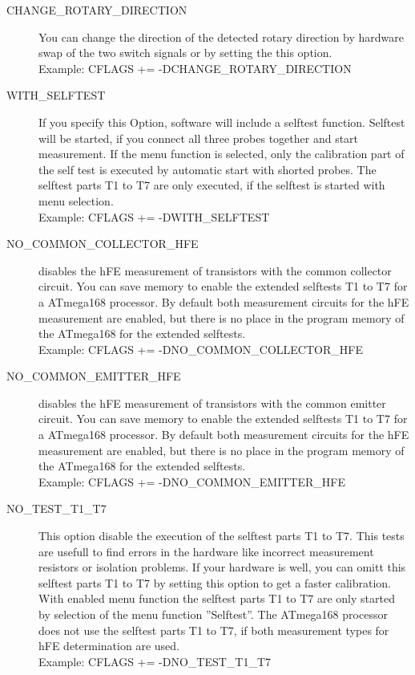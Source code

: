 \begin{description}
  \item[CHANGE\_ROTARY\_DIRECTION] You can change the direction of the detected rotary direction by hardware swap of
the two switch signals or by setting the this option.\\
Example: CFLAGS += -DCHANGE\_ROTARY\_DIRECTION

  \item[WITH\_SELFTEST] If you specify this Option, software will include a selftest function.
Selftest will be started, if you connect all three probes together and start measurement.
If the menu function is selected, only the calibration part of the self test is executed by automatic start with
shorted probes. The selftest parts T1 to T7 are only executed, if the selftest is started with menu selection.\\
Example: CFLAGS += -DWITH\_SELFTEST

  \item[NO\_COMMON\_COLLECTOR\_HFE] disables the hFE measurement of transistors with the common collector circuit.
You can save memory to enable the extended selftests T1 to T7 for a ATmega168 processor.
By default both measurement circuits for the hFE measurement are enabled, 
but there is no place in the program memory of the ATmega168 for the extended selftests.\\
Example: CFLAGS += -DNO\_COMMON\_COLLECTOR\_HFE

  \item[NO\_COMMON\_EMITTER\_HFE] disables the hFE measurement of transistors with the common emitter circuit.
You can save memory to enable the extended selftests T1 to T7 for a ATmega168 processor.
By default both measurement circuits for the hFE measurement are enabled, 
but there is no place in the program memory of the ATmega168 for the extended selftests.\\
Example: CFLAGS += -DNO\_COMMON\_EMITTER\_HFE

  \item[NO\_TEST\_T1\_T7] This option disable the execution of the selftest parts T1 to T7.
This tests are usefull to find errors in the hardware like incorrect measurement resistors or isolation problems.
If your hardware is well, you can omitt this selftest parts T1 to T7 by setting this option to get a faster calibration.
With enabled menu function the selftest parts T1 to T7 are only started by selection of the menu function ''Selftest''.
The ATmega168 processor does not use the selftest parts T1 to T7, if both measurement types for hFE determination are used.\\
Example: CFLAGS += -DNO\_TEST\_T1\_T7


\end{description}
